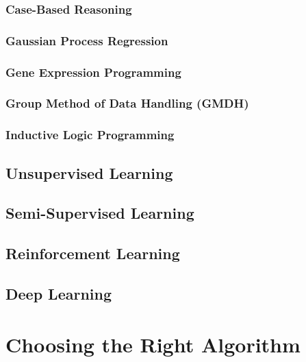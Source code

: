 \documentclass{report}
\begin{document}
	\subsection{Case-Based Reasoning}
	\subsection{Gaussian Process Regression}
	\subsection{Gene Expression Programming}
	\subsection{Group Method of Data Handling (GMDH)}
	\subsection{Inductive Logic Programming}

	
\section{Unsupervised Learning}

\section{Semi-Supervised Learning}

\section{Reinforcement Learning}

\section{Deep Learning}

\chapter{Choosing the Right Algorithm}
\end{document}
